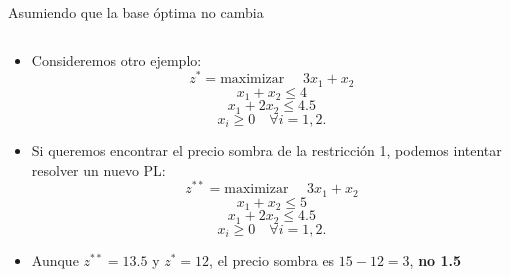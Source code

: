 \documentclass{beamer}
\begin{document}
\begin{frame}{Asumiendo que la base óptima no cambia}
\begin{columns}
  \begin{column}{0.6\textwidth}
  {\tiny 
    \begin{itemize}
        \item Consideremos otro ejemplo:
        \[
        z^* = \text{maximizar } \quad 3x_1 + x_2
        \]
        \[
        x_1 + x_2 \leq 4
        \]
        \[
        x_1 + 2x_2 \leq 4.5
        \]
        \[
        x_i \geq 0 \quad \forall i = 1, 2.
        \]
    \end{itemize}
    
    \begin{itemize}
        \item Si queremos encontrar el precio sombra de la restricción 1, podemos intentar resolver un nuevo PL:
        \[
        z^{**} = \text{maximizar } \quad 3x_1 + x_2
        \]
        \[
        x_1 + x_2 \leq 5
        \]
        \[
        x_1 + 2x_2 \leq 4.5
        \]
        \[
        x_i \geq 0 \quad \forall i = 1, 2.
        \]
    \end{itemize}

    \begin{itemize}
        \item Aunque $z^{**} = 13.5$ y $z^* = 12$, el precio sombra es $15 - 12 = 3$, \textbf{no 1.5}
    \end{itemize}
    
}
\end{column}
\end{columns}
\end{frame}
\end{document}
